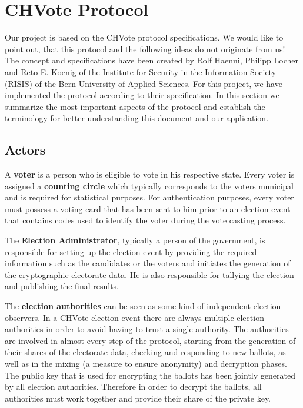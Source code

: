 \chapter{CHVote Protocol}
Our project is based on the CHVote protocol specifications. We would like to point out, that this protocol and the following ideas do not originate from us! The concept and specifications have been created by Rolf Haenni, Philipp Locher and Reto E. Koenig of the Institute for Security in the Information Society (RISIS) of the Bern University of Applied Sciences. For this project, we have implemented the protocol according to their specification. In this section we summarize the most important aspects of the protocol and establish the terminology for better understanding this document and our application.

\section{Actors}
A \textbf{voter} is a person who is eligible to vote in his respective state. Every voter is assigned a \textbf{counting circle} which typically corresponds to the voters municipal and is required for statistical purposes. For authentication purposes, every voter must possess a voting card that has been sent to him prior to an election event that contains codes used to identify the voter during the vote casting process.

The \textbf{Election Administrator}, typically a person of the government, is responsible for setting up the election event by providing the required information such as the candidates or the voters and initiates the generation of the cryptographic electorate data. He is also responsible for tallying the election and publishing the final results.

The \textbf{election authorities} can be seen as some kind of independent election observers. In a CHVote election event there are always multiple election authorities in order to avoid having to trust a single authority. The authorities are involved in almost every step of the protocol, starting from the generation of their shares of the electorate data, checking and responding to new ballots, as well as in the mixing (a measure to ensure anonymity) and decryption phases. The public key that is used for encrypting the ballots has been jointly generated by all election authorities. Therefore in order to decrypt the ballots, all authorities must work together and provide their share of the private key.

